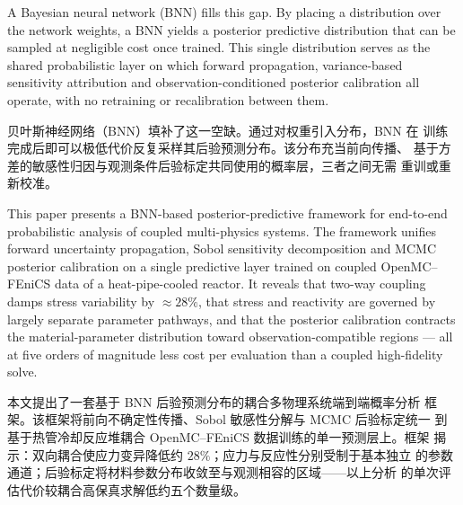 \documentclass[11pt,a4paper]{article}
\begin{document}
A Bayesian neural network (BNN) fills this gap. By placing a
distribution over the network weights, a BNN yields a posterior
predictive distribution that can be sampled at negligible cost once
trained. This single distribution serves as the shared probabilistic
layer on which forward propagation, variance-based sensitivity
attribution and observation-conditioned posterior calibration all
operate, with no retraining or recalibration between them.

贝叶斯神经网络（BNN）填补了这一空缺。通过对权重引入分布，BNN 在
训练完成后即可以极低代价反复采样其后验预测分布。该分布充当前向传播、
基于方差的敏感性归因与观测条件后验标定共同使用的概率层，三者之间无需
重训或重新校准。

This paper presents a BNN-based posterior-predictive framework for
end-to-end probabilistic analysis of coupled multi-physics systems. The
framework unifies forward uncertainty propagation, Sobol sensitivity
decomposition and MCMC posterior calibration on a single predictive
layer trained on coupled OpenMC--FEniCS data of a heat-pipe-cooled
reactor. It reveals that two-way coupling damps stress variability by
$\approx 28\%$, that stress and reactivity are governed by largely
separate parameter pathways, and that the posterior calibration contracts
the material-parameter distribution toward observation-compatible
regions --- all at five orders of magnitude less cost per evaluation
than a coupled high-fidelity solve.

本文提出了一套基于 BNN 后验预测分布的耦合多物理系统端到端概率分析
框架。该框架将前向不确定性传播、Sobol 敏感性分解与 MCMC 后验标定统一
到基于热管冷却反应堆耦合 OpenMC--FEniCS 数据训练的单一预测层上。框架
揭示：双向耦合使应力变异降低约 $28\%$；应力与反应性分别受制于基本独立
的参数通道；后验标定将材料参数分布收敛至与观测相容的区域——以上分析
的单次评估代价较耦合高保真求解低约五个数量级。
\end{document}
